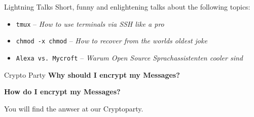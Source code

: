 \documentclass[10pt,graphics,aspectratio=169,table]{beamer}
\begin{document}
\begin{frame}{Lightning Talks}
    Short, funny and enlightening talks about the following topics:
    \begin{itemize}
        \item \texttt{tmux} -- \emph{How to use terminals via SSH like a pro}
        \item \texttt{chmod -x chmod} -- \emph{How to recover from the worlds oldest joke}
        \item \texttt{Alexa vs. Mycroft} -- \emph{Warum Open Source Sprachassistenten cooler sind}
    \end{itemize}
\end{frame}



\begin{frame}{Crypto Party}
    \centering \Large \textbf{Why should I encrypt my Messages?}

    \pause{}
    \textbf{How do I encrypt my Messages?}

    \vspace{.5cm}
    \pause{}
    \alert{You will find the anwser at our Cryptoparty.}
\end{frame}
\end{document}
